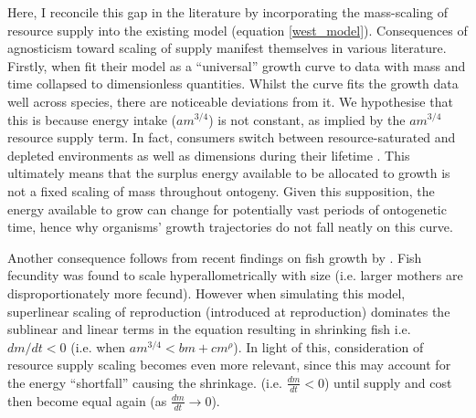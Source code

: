 \documentclass[a4paper]{article} %
\begin{document}
Here, I reconcile this gap in the literature by incorporating the mass-scaling of resource supply into the existing \cite{West2001} model (equation \eqref{west_model}). Consequences of agnosticism toward scaling of supply manifest themselves in various literature. Firstly, when \cite{West2001} fit their model as a ``universal'' growth curve to data with mass and time collapsed to dimensionless quantities. Whilst the curve fits the growth data well across species, there are noticeable deviations from it. We hypothesise that this is because energy intake ($am^{3/4}$) is not constant, as implied by the $am^{3/4}$ resource supply term. In fact, consumers switch between resource-saturated and depleted environments as well as dimensions during their lifetime \autocite{Pawar2012}. This ultimately means that the surplus energy available to be allocated to growth is not a fixed scaling of mass throughout ontogeny. Given this supposition, the energy available to grow can change for potentially vast periods of ontogenetic time, hence why organisms' growth trajectories do not fall neatly on this curve.

Another consequence follows from recent findings on fish growth by \cite{Barneche2018d}. Fish fecundity was found to scale hyperallometrically with size (i.e. larger mothers are disproportionately more fecund). However when simulating this model, superlinear scaling of reproduction (introduced at reproduction) dominates the sublinear and linear terms in the equation resulting in shrinking fish i.e. $dm/dt < 0$ (i.e. when $am^{3/4} < bm + cm^{\rho}$). In light of this, consideration of resource supply scaling becomes even more relevant, since this may account for the energy ``shortfall'' causing the shrinkage. (i.e. $\frac{dm}{dt} < 0$) until supply and cost then become equal again (as $\frac{dm}{dt} \rightarrow 0$). 
\end{document}
